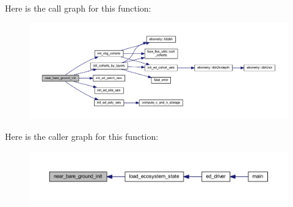 Here is the call graph for this function\+:\nopagebreak
\begin{figure}[H]
\begin{center}
\leavevmode
\includegraphics[width=350pt]{ed__nbg__init_8f90_a9bc82bf4faa4da0286c424058d8519a1_cgraph}
\end{center}
\end{figure}




Here is the caller graph for this function\+:\nopagebreak
\begin{figure}[H]
\begin{center}
\leavevmode
\includegraphics[width=350pt]{ed__nbg__init_8f90_a9bc82bf4faa4da0286c424058d8519a1_icgraph}
\end{center}
\end{figure}


